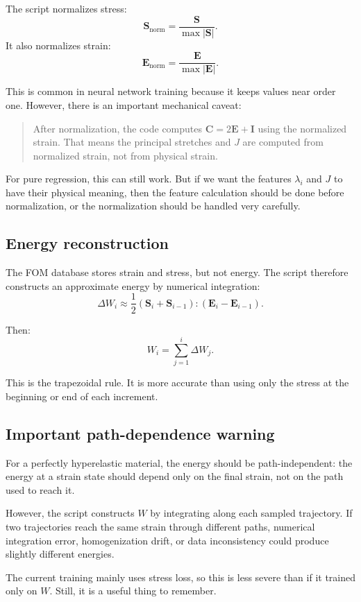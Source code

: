 \documentclass[11pt]{article}
\newcommand{\E}{\bm{E}}
\newcommand{\C}{\bm{C}}
\newcommand{\Sstress}{\bm{S}}
\newcommand{\I}{\bm{I}}
\begin{document}
The script normalizes stress:
\[
  \Sstress_{\mathrm{norm}}
  =
  \frac{\Sstress}{\max |\Sstress|}.
\]
It also normalizes strain:
\[
  \E_{\mathrm{norm}}
  =
  \frac{\E}{\max |\E|}.
\]

This is common in neural network training because it keeps values near order
one. However, there is an important mechanical caveat:

\begin{quote}
After normalization, the code computes $\C=2\E+\I$ using the normalized strain.
That means the principal stretches and $J$ are computed from normalized strain,
not from physical strain.
\end{quote}

For pure regression, this can still work. But if we want the features
$\lambda_i$ and $J$ to have their physical meaning, then the feature calculation
should be done before normalization, or the normalization should be handled very
carefully.

\subsection{Energy reconstruction}

The FOM database stores strain and stress, but not energy. The script therefore
constructs an approximate energy by numerical integration:
\[
  \Delta W_i
  \approx
  \frac{1}{2}
  \left(
    \Sstress_i+\Sstress_{i-1}
  \right)
  :
  \left(
    \E_i-\E_{i-1}
  \right).
\]

Then:
\[
  W_i = \sum_{j=1}^i \Delta W_j.
\]

This is the trapezoidal rule. It is more accurate than using only the stress at
the beginning or end of each increment.

\subsection{Important path-dependence warning}

For a perfectly hyperelastic material, the energy should be path-independent:
the energy at a strain state should depend only on the final strain, not on the
path used to reach it.

However, the script constructs $W$ by integrating along each sampled trajectory.
If two trajectories reach the same strain through different paths, numerical
integration error, homogenization drift, or data inconsistency could produce
slightly different energies.

The current training mainly uses stress loss, so this is less severe than if it
trained only on $W$. Still, it is a useful thing to remember.
\end{document}

